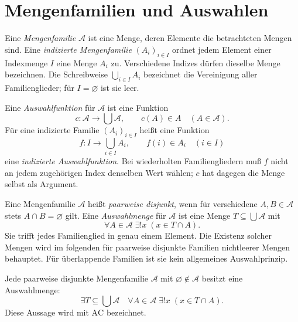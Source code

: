 \section{Mengenfamilien und Auswahlen}

\begin{definition}
Eine \emph{Mengenfamilie} $\mathcal A$ ist eine Menge, deren
Elemente die betrachteten Mengen sind.
Eine \emph{indizierte Mengenfamilie} $(A_i)_{i\in I}$ ordnet
jedem Element einer Indexmenge $I$ eine Menge $A_i$ zu.
Verschiedene Indizes dürfen dieselbe Menge bezeichnen.
Die Schreibweise $\bigcup_{i\in I}A_i$ bezeichnet die Vereinigung
aller Familienglieder; für $I=\varnothing$ ist sie leer.
\end{definition}

\begin{definition}
\label{b09guide:def:choice}
Eine \emph{Auswahlfunktion} für $\mathcal A$ ist eine Funktion
\[
 c\colon\mathcal A\longrightarrow\bigcup\mathcal A,
 \qquad c(A)\in A\quad(A\in\mathcal A).
\]
Für eine indizierte Familie $(A_i)_{i\in I}$ heißt eine Funktion
\[
 f\colon I\longrightarrow\bigcup_{i\in I}A_i,
 \qquad f(i)\in A_i\quad(i\in I)
\]
eine \emph{indizierte Auswahlfunktion}.
Bei wiederholten Familiengliedern muß $f$ nicht an jedem zugehörigen
Index denselben Wert wählen; $c$ hat dagegen die Menge selbst
als Argument.
\end{definition}

\begin{definition}
\label{b09guide:def:transversal}
Eine Mengenfamilie $\mathcal A$ heißt \emph{paarweise disjunkt},
wenn für verschiedene $A,B\in\mathcal A$ stets $A\cap B=\varnothing$
gilt. Eine \emph{Auswahlmenge} für $\mathcal A$ ist eine Menge
$T\subseteq\bigcup\mathcal A$ mit
\[
 \forall A\in\mathcal A\;\exists!x\;(x\in T\cap A).
\]
Sie trifft jedes Familienglied in genau einem Element.
Die Existenz solcher Mengen wird im folgenden für
paarweise disjunkte Familien nichtleerer Mengen behauptet.
Für überlappende Familien ist sie kein allgemeines Auswahlprinzip.
\end{definition}

\begin{axiom}
\label{b09guide:ax:choice}
Jede paarweise disjunkte Mengenfamilie $\mathcal A$ mit
$\varnothing\notin\mathcal A$ besitzt eine Auswahlmenge:
\[
 \exists T\subseteq\bigcup\mathcal A\quad
 \forall A\in\mathcal A\;\exists!x\;(x\in T\cap A).
\]
Diese Aussage wird mit $\mathrm{AC}$ bezeichnet.
\end{axiom}

